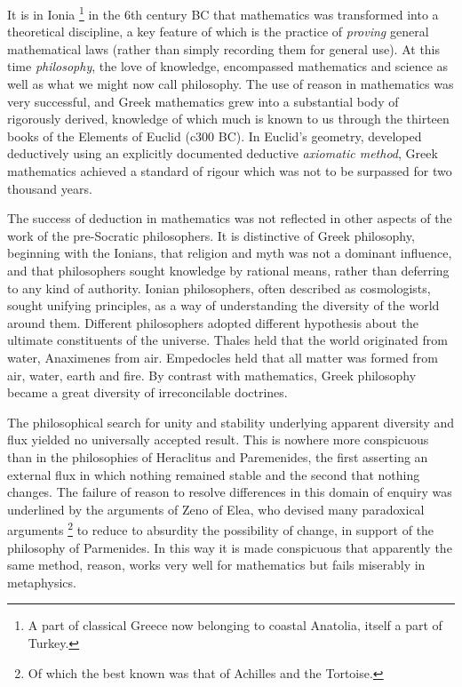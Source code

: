 It is in Ionia%
\footnote{A part of classical Greece now belonging to coastal Anatolia,
  itself a part of Turkey.}
 in the 6th century BC that mathematics was transformed into a
 theoretical discipline, a key feature of which is the practice of
 \emph{proving} general mathematical laws (rather than simply
 recording them for general use).
At this time \emph{philosophy}, the love of knowledge, encompassed
mathematics and science as well as what we might now call philosophy.
The use of reason in mathematics was very successful, and Greek
mathematics grew into a substantial body of rigorously derived,
knowledge of which much is known to us through the thirteen books of
the Elements of Euclid (c300 BC). 
In Euclid's geometry, developed deductively using an explicitly
documented deductive \emph{axiomatic method},
Greek mathematics achieved a standard of rigour which was not to be
surpassed for two thousand years.

The success of deduction in mathematics was not reflected in other
aspects of the work of the pre-Socratic philosophers.
It is distinctive of Greek philosophy, beginning with the Ionians,
that religion and myth was not a dominant influence, and that
philosophers sought knowledge by rational means, rather than deferring
to any kind of authority.
Ionian philosophers, often described as cosmologists, sought unifying
principles, as a way of understanding the diversity of the world
around them. 
Different philosophers adopted different hypothesis about the ultimate
constituents of the universe.
Thales held that the world originated from water, Anaximenes from air.
Empedocles held that all matter was formed from air, water, earth and
fire.
By contrast with mathematics, Greek philosophy became a great
diversity of irreconcilable doctrines.

The philosophical search for unity and stability underlying apparent
diversity and flux yielded no universally accepted result.
This is nowhere more conspicuous than in the philosophies of
Heraclitus and Paremenides, the
first asserting an external flux in which nothing remained stable and
the second that nothing changes. 
The failure of reason to resolve differences in this domain of enquiry
was underlined by the arguments of Zeno of Elea,
who devised many paradoxical arguments%
\footnote{Of which the best known was that of Achilles and the Tortoise.}
to reduce to absurdity the possibility of change, in support of the
philosophy of Parmenides.
In this way it is made conspicuous that apparently the same method,
reason, works very well for mathematics but fails miserably in
metaphysics.

